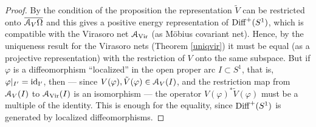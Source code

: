 \documentclass[12pt]{article}
\begin{document}
\begin{proof}
By the condition of the proposition the representation 
$\tilde{V}$ can be restricted onto
$\overline{{\mathcal A}_V\Omega}$ and this gives
a positive energy representation
of ${{\rm Diff}^+(S^1)}$, which is compatible
with the Virasoro net ${\mathcal A}_{\rm{Vir}}$ (as M\"obius covariant net).  
Hence, by the uniqueness result for the Virasoro nets (Theorem
\ref{uniqvir}) it must be equal (as a projective representation) 
with the restriction of $V$ onto the same subspace. But if $\varphi$ 
is a diffeomorphism ``localized'' in the open proper arc
$I \subset S^1$, that is, $\varphi|_{I'}=\rm{id}_{I'}$,
then --- since $V(\varphi),\tilde{V}(\varphi) \in {\mathcal A}_V(I)$,
and the restriction map from ${\mathcal A}_V(I)$ to ${\mathcal A}_{\rm{Vir}}(I)$
is an isomorphism --- the operator $V(\varphi)^*\tilde{V}(\varphi)$ must
be a multiple of the identity. This is enough for the equality, since
${{\rm Diff}^+(S^1)}$ is generated by localized diffeomorphisms.
\end{proof}
\end{document}
